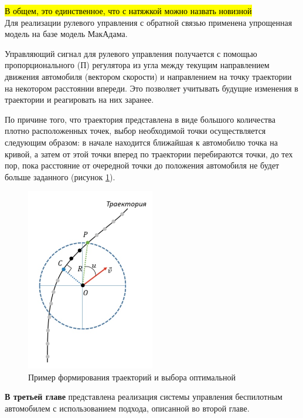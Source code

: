 \hl{В общем, это единственное, что с натяжкой можно назвать новизной}
\\

Для реализации рулевого управления с обратной связью применена упрощенная модель на базе
модель МакАдама.

Управляющий сигнал для рулевого управления получается с помощью пропорционального (П) регулятора 
из угла между текущим направлением движения автомобиля (вектором скорости) и направлением на 
точку траектории на некотором расстоянии впереди. Это позволяет учитывать будущие изменения 
в траектории и реагировать на них заранее. 

По причине того, что траектория представлена в виде большого количества плотно расположенных
точек, выбор необходимой точки осуществляется следующим образом: в начале находится ближайшая к автомобилю
точка на кривой, а затем от этой точки вперед по траектории перебираются точки, до тех пор, пока
расстояние от очередной точки до положения автомобиля не будет больше заданного (рисунок \ref{img:path_moving}). 

\begin{figure}[h]
    \centering
    \includegraphics[width=0.5\textwidth]{images/path_moving}
    \caption{Пример формирования траекторий и выбора оптимальной}
    \label{img:path_moving}
\end{figure}


\textbf{В третьей главе} представлена реализация системы управления беспилотным автомобилем с
использованием подхода, описанной во второй главе. 

